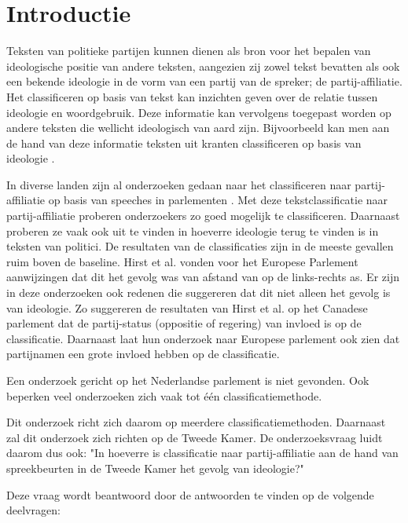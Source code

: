 \section{Introductie}
\label{sec:intro}
Teksten van politieke partijen kunnen dienen als bron voor het bepalen van ideologische positie van andere teksten, aangezien zij zowel tekst bevatten als ook een bekende ideologie in de vorm van een partij van de spreker; de partij-affiliatie. Het classificeren op basis van tekst kan inzichten geven over de relatie tussen ideologie en woordgebruik. Deze informatie kan vervolgens toegepast worden op andere teksten die wellicht ideologisch van aard zijn. Bijvoorbeeld kan men aan de hand van deze informatie teksten uit kranten classificeren op basis van ideologie \cite{DBLP:journals/corr/Biessmann16,Hirst_textto}.\par
In diverse landen zijn al onderzoeken gedaan naar het classificeren naar partij-affiliatie op basis van speeches in parlementen \cite{bhand,DBLP:journals/corr/Biessmann16,diermeier_godbout_yu_kaufmann_2012,Ferreira2016UsingTT,Hirst_textto,W14-2516,doi:10.1080/19331680802149608}. Met deze tekstclassificatie naar partij-affiliatie proberen onderzoekers zo goed mogelijk te classificeren. Daarnaast proberen ze vaak ook uit te vinden in hoeverre ideologie terug te vinden is in teksten van politici. De resultaten van de classificaties zijn in de meeste gevallen ruim boven de baseline. Hirst et al. \cite{Hirst_textto} vonden voor het Europese Parlement aanwijzingen dat dit het gevolg was van afstand van op de links-rechts as. Er zijn in deze onderzoeken ook redenen die suggereren dat dit niet alleen het gevolg is van ideologie. Zo suggereren de  resultaten van Hirst et al. op het Canadese parlement dat de partij-status (oppositie of regering) van invloed is op de classificatie. Daarnaast laat hun onderzoek naar Europese parlement ook zien dat partijnamen een grote invloed hebben op de classificatie.\par
Een onderzoek gericht op het Nederlandse parlement is niet gevonden. Ook beperken veel onderzoeken zich vaak tot één classificatiemethode.\par
Dit onderzoek richt zich daarom op meerdere classificatiemethoden. Daarnaast zal dit onderzoek zich richten op de Tweede Kamer. De onderzoeksvraag luidt daarom dus ook: "In hoeverre is classificatie naar partij-affiliatie aan de hand van spreekbeurten in de Tweede Kamer het gevolg van ideologie?"\par
Deze vraag wordt beantwoord door de antwoorden te vinden op de volgende deelvragen:
